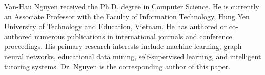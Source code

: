 \documentclass[10pt,journal,compsoc]{IEEEtran}
\begin{document}
\begin{IEEEbiographynophoto}{Van-Hau Nguyen}
received the Ph.D. degree in Computer Science. He is currently an Associate Professor with the Faculty of Information Technology, Hung Yen University of Technology and Education, Vietnam. He has authored or co-authored numerous publications in international journals and conference proceedings. His primary research interests include machine learning, graph neural networks, educational data mining, self-supervised learning, and intelligent tutoring systems. Dr. Nguyen is the corresponding author of this paper.
\end{IEEEbiographynophoto}
\end{document}
